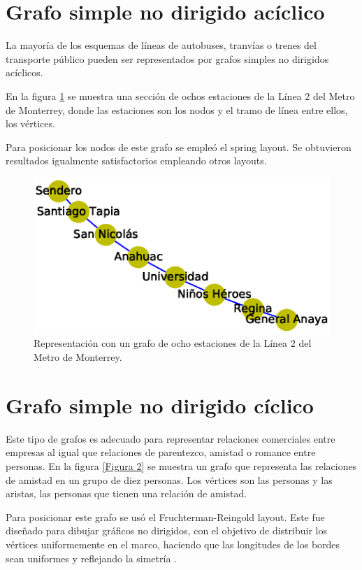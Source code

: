\documentclass{article}
\begin{document}
\section{Grafo simple no dirigido acíclico}

La mayoría de los esquemas de líneas de autobuses, tranvías o trenes del transporte público pueden ser representados por grafos simples no dirigidos acíclicos.

En la figura  \ref{Figura 1} se muestra una sección de ochos estaciones de la Línea 2 del Metro de Monterrey, donde las estaciones son los nodos y el tramo de línea entre ellos, los vértices. 

Para posicionar los nodos de este grafo se empleó el spring layout. Se obtuvieron resultados igualmente satisfactorios empleando otros layouts.

\begin{figure}
\begin{center}
  \includegraphics[width=.7\columnwidth]{fig1.eps}
   \end{center}
  \caption{Representación con un grafo de ocho estaciones de la Línea 2 del Metro de Monterrey.}
  \label{Figura 1}
 
\end{figure}



\section{Grafo simple no dirigido cíclico}

Este tipo de grafos es adecuado para representar relaciones comerciales entre empresas al igual que relaciones de parentezco, amistad o romance entre personas.
En la figura \ref{Figura 2} se muestra un grafo que representa las relaciones de amistad en un grupo de diez personas. Los vértices son las personas y las aristas, las personas que tienen una relación de amistad.

Para posicionar este grafo se usó el Fruchterman-Reingold layout. Este fue diseñado para dibujar gráficos no dirigidos, con el objetivo de distribuir los vértices uniformemente en el marco, haciendo que las longitudes de los bordes sean uniformes y reflejando la simetría \cite{fruchterman1991graph}.
 
\end{document}

